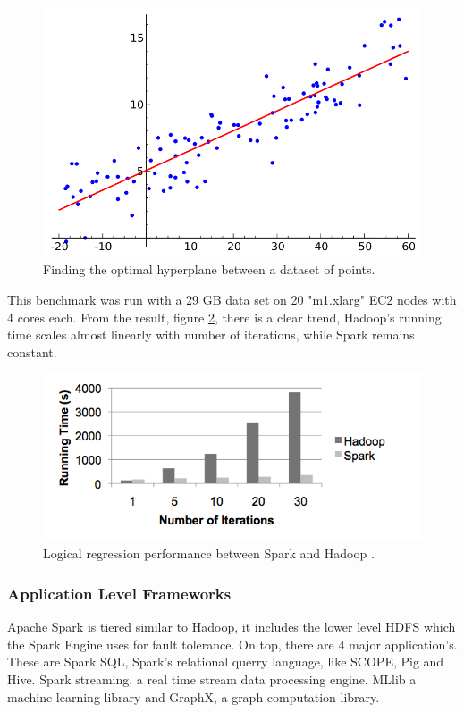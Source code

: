 \documentclass[10pt,twocolumn]{IEEEtran11}
\begin{document}
\begin{figure}[h]
	\centering
	\includegraphics[scale=0.3]{images/logicalRegression.png}
	\caption{Finding the optimal hyperplane between a dataset of points.}
	\label{fig:logicalRegression}
\end{figure}

This benchmark was run with a 29 GB data set on 20 "m1.xlarg" EC2 nodes with 4 cores each.  From the result, figure \ref{fig:sparkPerformance},  there is a clear trend, Hadoop's running time scales almost linearly with number of iterations, while Spark remains constant.

\begin{figure}[h]
	\centering
	\includegraphics[scale=0.6]{images/sparkPerformance.png}
	\caption{Logical regression performance between Spark and Hadoop  \protect\cite{zaharia2010spark}.}
	\label{fig:sparkPerformance}
\end{figure}

\subsubsection{Application Level Frameworks}
Apache Spark is tiered similar to Hadoop, it includes the lower level HDFS which the Spark Engine uses for fault tolerance.  On top, there are 4 major application's.  These are Spark SQL, Spark's relational querry language, like SCOPE, Pig and Hive.  Spark streaming, a real time stream data processing engine.  MLlib a machine learning library and GraphX, a graph computation library.
\end{document}
